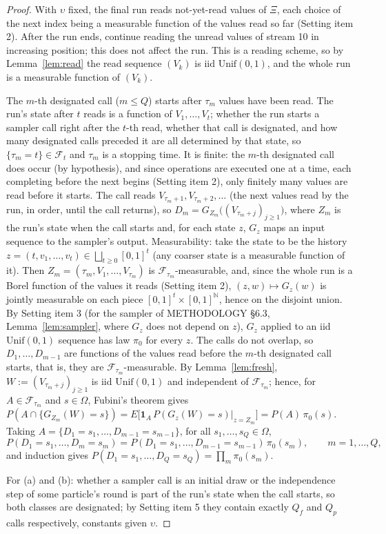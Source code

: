 \documentclass[11pt]{article}
\theoremstyle{remark}
\newcommand{\cF}{\mathcal{F}}
\newcommand{\Unif}{\mathrm{Unif}(0,1)}
\newcommand{\1}{\mathbf{1}}
\begin{document}
\begin{proof}
With $\upsilon$ fixed, the final run reads not-yet-read values of $\Xi$, each choice of the next index being a
measurable function of the values read so far (Setting item 2). After the run ends, continue reading the unread
values of stream 10 in increasing position; this does not affect the run. This is a reading scheme, so by
Lemma~\ref{lem:read} the read sequence $(V_k)$ is iid $\Unif$, and the whole run is a measurable function of
$(V_k)$.

The $m$-th designated call ($m\le Q$) starts after $\tau_m$ values have been read. The run's state after $t$ reads is
a function of $V_1,\dots,V_t$; whether the run starts a sampler call right after the $t$-th read, whether that call is
designated, and how many designated calls preceded it are all determined by that state, so $\{\tau_m=t\}\in\cF_t$ and
$\tau_m$ is a stopping time. It is finite: the $m$-th designated call does occur (by hypothesis), and since operations
are executed one at a time, each completing before the next begins (Setting item 2), only finitely many values are read
before it starts. The call reads $V_{\tau_m+1},V_{\tau_m+2},\dots$ (the next values read by the run, in order, until the
call returns), so $D_m=G_{Z_m}\big((V_{\tau_m+j})_{j\ge1}\big)$, where $Z_m$ is the run's state when the call starts
and, for each state $z$, $G_z$ maps an input sequence to the sampler's output. Measurability: take the state to be
the history $z=(t,v_1,\dots,v_t)\in\bigsqcup_{t\ge0}[0,1]^t$ (any coarser state is a measurable function of it). Then
$Z_m=(\tau_m,V_1,\dots,V_{\tau_m})$ is $\cF_{\tau_m}$-measurable, and, since the whole run is a Borel function of the
values it reads (Setting item 2), $(z,w)\mapsto G_z(w)$ is jointly measurable on each piece $[0,1]^t\times[0,1]^{\mathbb N}$,
hence on the disjoint union.
By Setting item 3 (for the sampler of METHODOLOGY \S6.3, Lemma~\ref{lem:sampler}, where $G_z$ does not depend on $z$),
$G_z$ applied to an iid $\Unif$ sequence has law $\pi_0$ for every $z$. The calls do not overlap, so
$D_1,\dots,D_{m-1}$ are functions of the values read before the $m$-th designated call starts, that is, they are
$\cF_{\tau_m}$-measurable. By Lemma~\ref{lem:fresh}, $W:=(V_{\tau_m+j})_{j\ge1}$ is iid $\Unif$ and independent of
$\cF_{\tau_m}$; hence, for $A\in\cF_{\tau_m}$ and $s\in\Omega$, Fubini's theorem gives
$P(A\cap\{G_{Z_m}(W)=s\})=E\big[\1_A\,P(G_z(W)=s)|_{z=Z_m}\big]=P(A)\,\pi_0(s)$. Taking
$A=\{D_1=s_1,\dots,D_{m-1}=s_{m-1}\}$, for all $s_1,\dots,s_Q\in\Omega$,
\[
P(D_1=s_1,\dots,D_m=s_m)=P(D_1=s_1,\dots,D_{m-1}=s_{m-1})\,\pi_0(s_m),\qquad m=1,\dots,Q,
\]
and induction gives $P(D_1=s_1,\dots,D_Q=s_Q)=\prod_m\pi_0(s_m)$.

For (a) and (b): whether a sampler call is an initial draw or the independence step of some particle's round is part
of the run's state when the call starts, so both classes are designated; by Setting item 5 they contain exactly $Q_f$
and $Q_p$ calls respectively, constants given $\upsilon$.
\end{proof}
\end{document}
